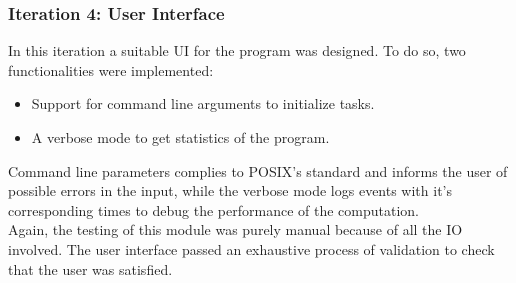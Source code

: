       \subsubsection{Iteration 4: User Interface}

      In this iteration a suitable UI for the program was designed. To do so,
      two functionalities were implemented:
      \begin{itemize}
        \item Support for command line arguments to initialize tasks.
        \item A verbose mode to get statistics of the program.
      \end{itemize}

      Command line parameters complies to POSIX's standard and informs the
      user of possible errors in the input, while the verbose mode logs events
      with it's corresponding times to debug the performance of the
      computation.\\

      Again, the testing of this module was purely manual because of all
      the IO involved. The user interface passed an exhaustive process of
      validation to check that the user was satisfied.\\
